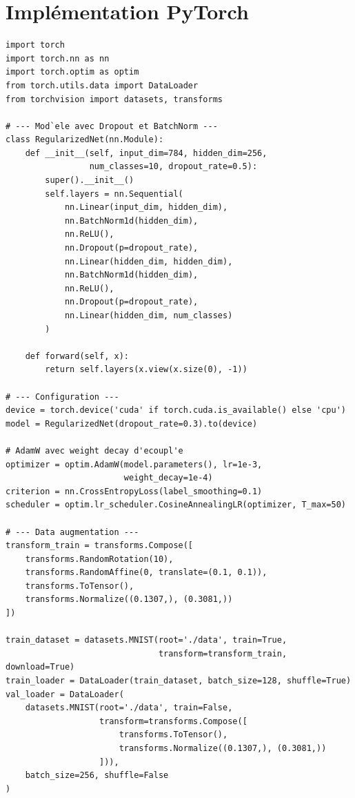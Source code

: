 \section{Impl\'ementation PyTorch}
\label{sec:reg-pytorch}

\begin{codeblock}[title=\textbf{Boucle d'entra\^inement r\'egularis\'ee compl\`ete}]
\begin{verbatim}
import torch
import torch.nn as nn
import torch.optim as optim
from torch.utils.data import DataLoader
from torchvision import datasets, transforms

# --- Mod`ele avec Dropout et BatchNorm ---
class RegularizedNet(nn.Module):
    def __init__(self, input_dim=784, hidden_dim=256,
                 num_classes=10, dropout_rate=0.5):
        super().__init__()
        self.layers = nn.Sequential(
            nn.Linear(input_dim, hidden_dim),
            nn.BatchNorm1d(hidden_dim),
            nn.ReLU(),
            nn.Dropout(p=dropout_rate),
            nn.Linear(hidden_dim, hidden_dim),
            nn.BatchNorm1d(hidden_dim),
            nn.ReLU(),
            nn.Dropout(p=dropout_rate),
            nn.Linear(hidden_dim, num_classes)
        )

    def forward(self, x):
        return self.layers(x.view(x.size(0), -1))

# --- Configuration ---
device = torch.device('cuda' if torch.cuda.is_available() else 'cpu')
model = RegularizedNet(dropout_rate=0.3).to(device)

# AdamW avec weight decay d'ecoupl'e
optimizer = optim.AdamW(model.parameters(), lr=1e-3,
                        weight_decay=1e-4)
criterion = nn.CrossEntropyLoss(label_smoothing=0.1)
scheduler = optim.lr_scheduler.CosineAnnealingLR(optimizer, T_max=50)

# --- Data augmentation ---
transform_train = transforms.Compose([
    transforms.RandomRotation(10),
    transforms.RandomAffine(0, translate=(0.1, 0.1)),
    transforms.ToTensor(),
    transforms.Normalize((0.1307,), (0.3081,))
])

train_dataset = datasets.MNIST(root='./data', train=True,
                               transform=transform_train, download=True)
train_loader = DataLoader(train_dataset, batch_size=128, shuffle=True)
val_loader = DataLoader(
    datasets.MNIST(root='./data', train=False,
                   transform=transforms.Compose([
                       transforms.ToTensor(),
                       transforms.Normalize((0.1307,), (0.3081,))
                   ])),
    batch_size=256, shuffle=False
)


\end{verbatim}
\end{codeblock}
